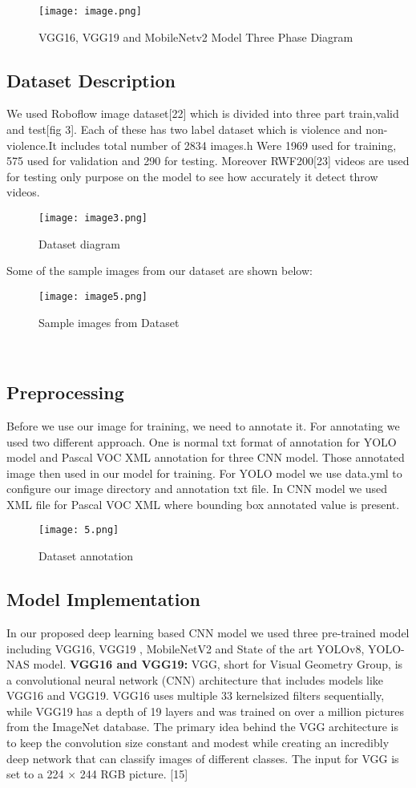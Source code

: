 \documentclass[conference]{IEEEtran}
\begin{document}
\begin{figure}
    \centering
    \texttt{[image: image.png]}
    \caption{VGG16, VGG19 and MobileNetv2 Model Three Phase Diagram }
    \label{fig:2}
\end{figure}

\subsection{Dataset Description }\label{AA}
We used Roboflow image dataset[22] which is divided into three part train,valid and test[fig 3]. Each of these has two label dataset which is violence and non-violence.It includes total number of 2834 images.h Were 1969 used for training, 575 used for validation and 290 for testing. Moreover RWF200[23] videos are used for testing only purpose on the model to see how accurately it detect throw videos. 

\begin{figure}
    \centering
    \texttt{[image: image3.png]}
    \caption{Dataset diagram}
    \label{fig:3}
\end{figure} 
Some of the sample images from our dataset are shown below:
\begin{figure}
    \centering
    \texttt{[image: image5.png]}
    \caption{Sample images from Dataset}
    \label{fig:4}
\end{figure}
\\
\subsection{Preprocessing }
Before we use our image for training, we need to annotate it. For annotating we used two different approach. One is normal txt format of annotation for YOLO model and Pascal VOC XML annotation for three CNN model. Those annotated image then used in our model for training. For YOLO model we use data.yml to configure our image directory and annotation txt file. In CNN model we used XML file for Pascal VOC XML where bounding box annotated value is present. 
\begin{figure}
    \centering
    \texttt{[image: 5.png]}
    \caption{Dataset annotation }
    \label{fig:5}
\end{figure}


\subsection{Model Implementation }
In our proposed deep learning based CNN model we used three pre-trained model including VGG16, VGG19 , MobileNetV2 and State of the art YOLOv8, YOLO-NAS model. 
\textbf{VGG16 and  VGG19:} VGG, short for Visual Geometry Group, is a convolutional neural network (CNN) architecture that includes models like VGG16 and VGG19. VGG16 uses multiple 33 kernelsized filters sequentially, while VGG19 has a depth of 19 layers and was trained on over a million pictures from the ImageNet database. The primary idea behind the VGG architecture is to keep the convolution size constant and modest while creating an incredibly deep network that can classify images of different classes. The input for VGG is set to a 224 × 244 RGB picture. [15]
\end{document}
